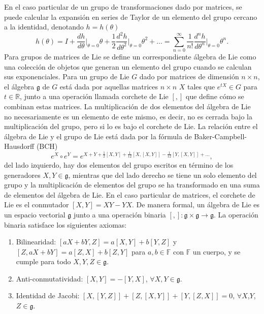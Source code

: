En el caso particular de un grupo de transformaciones dado por matrices, se puede calcular la expansión en series de Taylor de un elemento del grupo cercano a la identidad, denotando $h = h(\theta)$
\begin{equation}
  h(\theta) = I + \frac{dh}{d\theta}\bigg|_{\theta=0}\theta + \frac{1}{2}\frac{d^2h}{d\theta^2}\bigg|_{\theta=0}\theta^2 + \dots = \sum_{n=0}^{\infty} \frac{1}{n!}\frac{d^n h}{d\theta^n}\bigg|_{\theta=0}\theta^n.
\end{equation}
Para grupos de matrices de Lie se define un correspondiente álgebra de Lie como una colección de objetos que generan un elemento del grupo cuando se calculan sus exponenciales. Para un grupo de Lie $G$ dado por matrices de dimensión $n\times n$, el álgebra $\mathfrak{g}$ de $G$ está dada por aquellas matrices $n\times n$ $X$ tales que $e^{tX}\in G$ para $t\in \mathbb{R}$, junto a una operación llamada corchete de Lie $[,]$ que define cómo se combinan estas matrices. La multiplicación de dos elementos del álgebra de Lie no necesariamente es un elemento de este mismo, es decir, no es cerrada bajo la multiplicación del grupo, pero si lo es bajo el corchete de Lie. La relación entre el álgebra de Lie y el grupo de Lie está dada por la fórmula de Baker-Campbell-Hausdorff (BCH)
\begin{equation}
  e^X \circ e^Y = e^{X+Y+\frac{1}{2}[X,Y] + \frac{1}{12}[X,[X,Y]] - \frac{1}{12}[Y,[X,Y]] + \dots},
\end{equation}
del lado izquierdo, hay dos elementos del grupo escritos en término de los generadores $X,Y\in \mathfrak{g}$, mientras que del lado derecho se tiene un solo elemento del grupo y la multiplicación de elementos del grupo se ha transformado en una suma de elementos del álgebra de Lie. En el caso particular de matrices, el corchete de Lie es el conmutador $[X,Y] = XY-YX$.
De manera formal, un álgebra de Lie es un espacio vectorial $\mathfrak{g}$ junto a una operación binaria $[,]:\mathfrak{g}\times \mathfrak{g} \to \mathfrak{g}$. La operación binaria satisface los siguientes axiomas:
\begin{enumerate}
  \item Bilinearidad: $[aX + bY, Z] = a[X,Y] + b[Y, Z]$ y $[Z, aX + bY] = a[Z,X] + b[Z,Y]$ para $a,b\in \mathbb{F}$ con $\mathbb{F}$ un cuerpo, y se cumple para todo $X,Y,Z\in \mathfrak{g}$.
  \item Anti-conmutatividad: $[X,Y] = -[Y,X]$, $\forall X, Y \in \mathfrak{g}$.
  \item Identidad de Jacobi: $[X, [Y,Z]] + [Z,[X,Y]] + [Y,[Z,X]] = 0$, $\forall X$,$Y$,$Z\in \mathfrak{g}$.
\end{enumerate}

